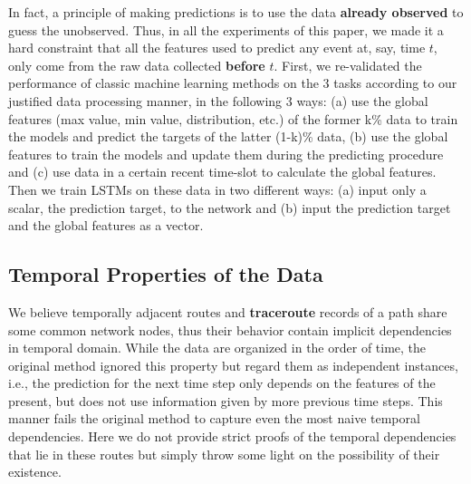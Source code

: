 \documentclass[sigconf]{acmart}
\begin{document}
In fact, a principle of making predictions is to use the data \textbf{already observed} to guess the unobserved. Thus, in all the experiments of this paper, we made it a hard constraint that all the features used to predict any event at, say, time $t$, only come from the raw data collected \textbf{before} $t$. First, we re-validated the performance of classic machine learning methods on the 3 tasks according to our justified data processing manner, in the following 3 ways: (a) use the global features (max value, min value, distribution, etc.) of the former k\% data to train the models and predict the targets of the latter (1-k)\% data, (b) use the global features to train the models and update them during the predicting procedure and (c) use data in a certain recent time-slot to calculate the global features. Then we train LSTMs on these data in two different ways: (a) input only a scalar, the prediction target, to the network and (b) input the prediction target and the global features as a vector.

\subsection{Temporal Properties of the Data}
We believe temporally adjacent routes and \textbf{traceroute} records of a path share some common network nodes, thus their behavior contain implicit dependencies in temporal domain. While the data are organized in the order of time, the original method ignored this property but regard them as independent instances, i.e., the prediction for the next time step only depends on the features of the present, but does not use information given by more previous time steps. This manner fails the original method to capture even the most naive temporal dependencies. Here we do not provide strict proofs of the temporal dependencies that lie in these routes but simply throw some light on the possibility of their existence.
\end{document}
